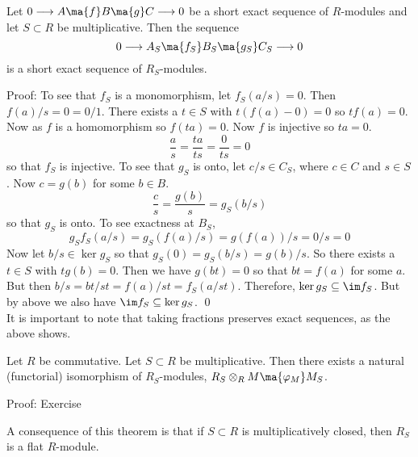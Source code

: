 \begin{prop}
Let $0 \longrightarrow A \ma{f} B \ma{g} C \longrightarrow  0$ be a short exact sequence of $R$-modules and let $S \subset R$ be multiplicative. Then the sequence 
\[
0 \longrightarrow A_S \ma{f_S} B_S \ma{g_S} C_S \longrightarrow 0
\]
is a short exact sequence of $R_S$-modules. 
\end{prop}

Proof: To see that $f_S$ is a monomorphism, let $f_S(a/s)=0$. Then $f(a)/s=0=0/1$. There exists a $t \in S$ with $t(f(a)-0)=0$ so $tf(a)=0$. Now as $f$ is a homomorphism so $f(ta)=0$. Now $f$ is injective so $ta=0$. 
\[
\frac{a}{s}=\frac{ta}{ts}=\frac{0}{ts}=0
\]
so that $f_S$ is injective. To see that $g_S$ is onto, let $c/s \in C_S$, where $c \in C$ and $s \in S$. Now $c=g(b)$ for some $b \in B$. 
\[
\frac{c}{s}=\frac{g(b)}{s}=g_S(b/s)
\]
so that $g_S$ is onto. To see exactness at $B_S$,
\[
g_Sf_S(a/s)=g_S(f(a)/s)=g(f(a))/s=0/s=0
\]
Now let $b/s \in \ker g_S$ so that $g_S(0)=g_S(b/s)=g(b)/s$. So there exists a $t \in S$ with $tg(b)=0$. Then we have $g(bt)=0$ so that $bt=f(a)$ for some $a$. But then $b/s=bt/st=f(a)/st=f_S(a/st)$. Therefore, $\ker g_S \subseteq \im f_S$. But by above we also have $\im f_S \subseteq \ker g_S$. \qed \\

It is important to note that taking fractions preserves exact sequences, as the above shows.

\begin{thm}
Let $R$ be commutative. Let $S \subset R$ be multiplicative. Then there exists a natural (functorial) isomorphism of $R_S$-modules, $R_S \otimes_R M \ma{\varphi_M} M_S$.
\end{thm}

Proof: Exercise 

A consequence of this theorem is that if $S \subset R$ is multiplicatively closed, then $R_S$ is a flat $R$-module. 










































